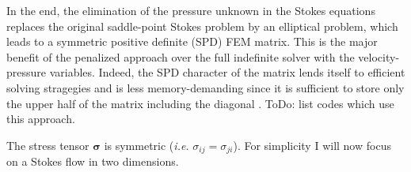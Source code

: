 In the end, the elimination of the pressure unknown in the Stokes equations
replaces the original saddle-point Stokes problem \cite{begl05} by an elliptical problem, 
which leads to a symmetric positive definite (SPD) FEM matrix. 
This is the major benefit of the penalized approach 
over the full indefinite solver with the velocity-pressure variables. Indeed, the SPD character of the matrix lends itself 
to efficient solving stragegies and is less memory-demanding since it is sufficient to store only the upper half of the matrix including the diagonal
\cite{gova}
.
ToDo: list codes which use this approach.

\newpage

The stress tensor ${\bm \sigma}$ is symmetric ({\it i.e.} $\sigma_{ij}=\sigma_{ji}$). For simplicity
I will now focus on a Stokes flow in two dimensions. 


